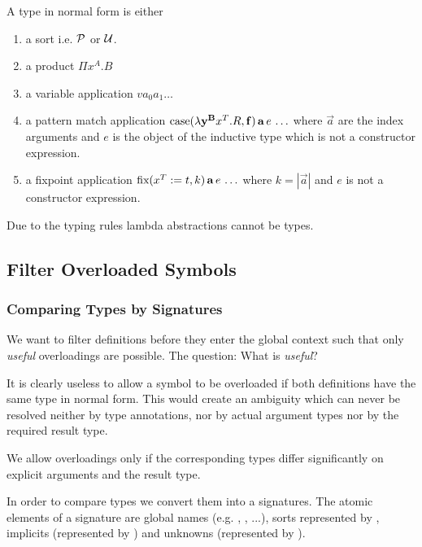 A type in normal form is either
\begin{enumerate}

\item a sort i.e. ${\cal{P}}$ or ${\cal{U}}$.

\item a product $\Pi x^A. B$

\item a variable application $v a_0 a_1 \ldots$

\item a pattern match application
    $\text{case}(\lambda \mathbf{y}^{\mathbf{B}} x^T. R, \mathbf{f}) \,\mathbf{a}\, e\, \ldots$
    where $\vec{a}$ are the index arguments and $e$ is the object of the
    inductive type which is not a constructor expression.

\item a fixpoint application
    $\text{fix}(x^T := t, k)\, \mathbf{a}\, e\, \ldots$
    where $k = |\vec{a}|$ and $e$ is not a constructor expression.
\end{enumerate}
%
Due to the typing rules lambda abstractions cannot be types.





\subsection{Filter Overloaded Symbols}


\subsubsection{Comparing Types by Signatures}

We want to filter definitions before they enter the global context such that
only \emph{useful} overloadings are possible. The question: What is
\emph{useful}?

It is clearly useless to allow a symbol to be overloaded if both definitions
have the same type in normal form. This would create an ambiguity which can
never be resolved neither by type annotations, nor by actual argument types nor
by the required result type.

We allow overloadings only if the corresponding types differ significantly on
explicit arguments and the result type.

In order to compare types we convert them into a signatures. The atomic elements
of a signature are global names (e.g. , , ...), sorts
represented by , implicits
(represented by ) and unknowns (represented by ).

